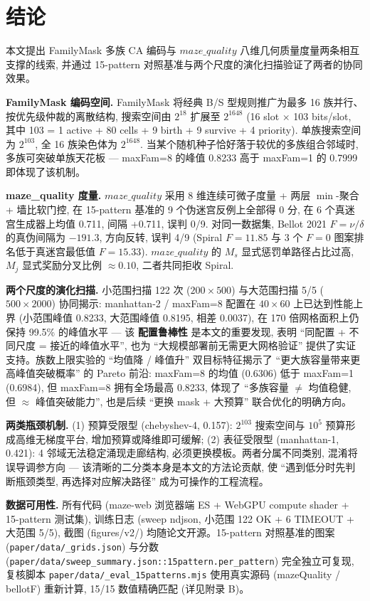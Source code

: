 
\section{结论}
\label{sec:conclusion}

本文提出 FamilyMask 多族 CA 编码与 $maze\_quality$ 八维几何质量度量两条相互支撑的线索, 并通过 15-pattern 对照基准与两个尺度的演化扫描验证了两者的协同效果。

\noindent\textbf{FamilyMask 编码空间.} FamilyMask 将经典 B/S 型规则推广为最多 16 族并行、按优先级仲裁的离散结构, 搜索空间由 $2^{18}$ 扩展至 $2^{1648}$ (16 slot $\times$ 103 bits/slot, 其中 103 = 1 active + 80 cells + 9 birth + 9 survive + 4 priority). 单族搜索空间为 $2^{103}$, 全 16 族染色体为 $2^{1648}$. 当某个随机种子恰好落于较优的多族组合邻域时, 多族可突破单族天花板 --- maxFam=8 的峰值 0.8233 高于 maxFam=1 的 0.7999 即体现了该机制。

\noindent\textbf{maze\_quality 度量.} $maze\_quality$ 采用 8 维连续可微子度量 + 两层 $\min$-聚合 + 墙比软门控, 在 15-pattern 基准的 9 个伪迷宫反例上全部得 0 分, 在 6 个真迷宫生成器上均值 0.711, 间隔 +0.711, 误判 0/9. 对同一数据集, Bellot 2021 $F = \nu / \delta$ 的真伪间隔为 $-191.3$, 方向反转, 误判 4/9 (Spiral $F = 11.85$ 与 3 个 $F = 0$ 图案排名低于真迷宫最低值 $F = 15.33$). $maze\_quality$ 的 $M_s$ 显式惩罚单路径占比过高, $M_j$ 显式奖励分叉比例 $\approx 0.10$, 二者共同拒收 Spiral.

\noindent\textbf{两个尺度的演化扫描.} 小范围扫描 122 次 ($200 \times 500$) 与大范围扫描 5/5 ($500 \times 2000$) 协同揭示: manhattan-2 / maxFam=8 配置在 $40 \times 60$ 上已达到性能上界 (小范围峰值 0.8233, 大范围峰值 0.8195, 相差 0.0037), 在 170 倍网格面积上仍保持 99.5\% 的峰值水平 --- 该 \textbf{配置鲁棒性} 是本文的重要发现, 表明 ``同配置 + 不同尺度 = 接近的峰值水平'', 也为 ``大规模部署前无需更大网格验证'' 提供了实证支持。族数上限实验的 ``均值降 / 峰值升'' 双目标特征揭示了 ``更大族容量带来更高峰值突破概率'' 的 Pareto 前沿: maxFam=8 的均值 (0.6306) 低于 maxFam=1 (0.6984), 但 maxFam=8 拥有全场最高 0.8233, 体现了 ``多族容量 $\neq$ 均值稳健, 但 $\approx$ 峰值突破能力'', 也是后续 ``更换 mask + 大预算'' 联合优化的明确方向。

\noindent\textbf{两类瓶颈机制.} (1) 预算受限型 (chebyshev-4, 0.157): $2^{103}$ 搜索空间与 $10^5$ 预算形成高维无梯度平台, 增加预算或降维即可缓解; (2) 表征受限型 (manhattan-1, 0.421): 4 邻域无法稳定涌现走廊结构, 必须更换模板。两者分属不同类别, 混淆将误导调参方向 --- 该清晰的二分类本身是本文的方法论贡献, 使 ``遇到低分时先判断瓶颈类型, 再选择对应解决路径'' 成为可操作的工程流程。

\noindent\textbf{数据可用性.} 所有代码 (maze-web 浏览器端 ES + WebGPU compute shader + 15-pattern 测试集), 训练日志 (sweep ndjson, 小范围 122 OK + 6 TIMEOUT + 大范围 5/5), 截图 (figures/v2/) 均随论文开源。15-pattern 对照基准的图案 (\texttt{paper/data/\_grids.json}) 与分数 (\texttt{paper/data/sweep\_summary.json::15pattern.per\_pattern}) 完全独立可复现, 复核脚本 \texttt{paper/data/\_eval\_15patterns.mjs} 使用真实源码 (mazeQuality / bellotF) 重新计算, 15/15 数值精确匹配 (详见附录 B)。
